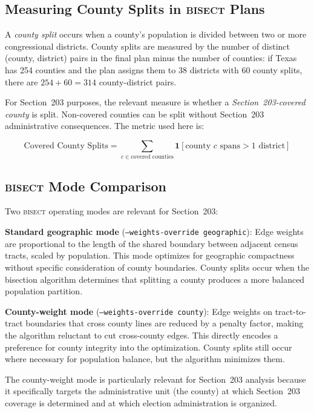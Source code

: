 \label{sec:methodology}

\subsection{Measuring County Splits in \textsc{bisect} Plans}

A \textit{county split} occurs when a county's population is divided
between two or more congressional districts. County splits are measured
by the number of distinct (county, district) pairs in the final plan
minus the number of counties: if Texas has 254 counties and the plan
assigns them to 38 districts with 60 county splits, there are $254 + 60 = 314$
county-district pairs.

For Section~203 purposes, the relevant measure is whether a
\textit{Section~203-covered county} is split. Non-covered counties can be
split without Section~203 administrative consequences. The metric used here
is:

\[
\text{Covered County Splits} = \sum_{c \in \text{covered counties}} \mathbf{1}[\text{county } c \text{ spans} > 1 \text{ district}]
\]

\subsection{\textsc{bisect} Mode Comparison}

Two \textsc{bisect} operating modes are relevant for Section~203:

\textbf{Standard geographic mode} (\texttt{--weights-override geographic}):
Edge weights are proportional to the length of the shared boundary between
adjacent census tracts, scaled by population. This mode optimizes for
geographic compactness without specific consideration of county boundaries.
County splits occur when the bisection algorithm determines that splitting
a county produces a more balanced population partition.

\textbf{County-weight mode} (\texttt{--weights-override county}):
Edge weights on tract-to-tract boundaries that cross county lines are
reduced by a penalty factor, making the algorithm reluctant to cut
cross-county edges. This directly encodes a preference for county
integrity into the optimization. County splits still occur where
necessary for population balance, but the algorithm minimizes them.

The county-weight mode is particularly relevant for Section~203 analysis
because it specifically targets the administrative unit (the county)
at which Section~203 coverage is determined and at which election
administration is organized.

